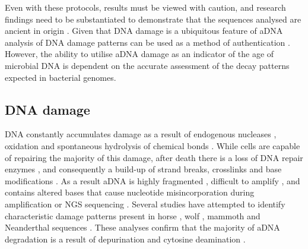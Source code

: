 \documentclass[12pt, a4paper]{article}
\begin{document}
Even with these protocols, results must be viewed with caution, and research findings need to be substantiated to demonstrate that the sequences analysed are ancient in origin \cite{Eisenhofer:2016aa}. 
Given that DNA damage is a ubiquitous feature of aDNA \cite{Briggs:2010aa,Sawyer:2012aa} analysis of DNA damage patterns can be used as a method of authentication  \cite{Poinar:2006aa,Zaremba-Niedzwiedzka:2013aa}. 
However, the ability to utilise aDNA damage as an indicator of the age of microbial DNA is dependent on the accurate assessment of the decay patterns expected in bacterial genomes.

\subsection{DNA damage}\label{sec:DNAdamage}
DNA constantly accumulates damage as a result of endogenous nucleases \cite{Briggs:2010aa}, oxidation and spontaneous hydrolysis of chemical bonds \cite{Schroeder:2007aa,Hoss:1996aa}. 
While cells are capable of repairing the majority of this damage, after death there is a loss of DNA repair enzymes \cite{Lindahl:1993aa, Willerslev:2004aa}, and consequently a build-up of strand breaks, crosslinks and base modifications \cite{Briggs:2007aa,Paabo:1989aa,Sawyer:2012aa}. 
As a result aDNA is highly fragmented \cite{Lindahl:1993aa,Briggs:2007aa}, difficult to amplify \cite{Willerslev:2004aa}, and contains altered bases that cause nucleotide misincorporation during amplification or \gls{NGS} sequencing \cite{Stiller:2006aa,Briggs:2007aa}.
Several studies have attempted to identify characteristic damage patterns present in horse \cite{Orlando:2011aa}, wolf \cite{Stiller:2006aa}, mammoth and Neanderthal sequences \cite{Briggs:2007aa,Briggs:2010aa,Stiller:2006aa}.
These analyses confirm that the majority of aDNA degradation is a result of depurination and cytosine deamination \cite{Briggs:2007aa}.
\clearpage
\end{document}
